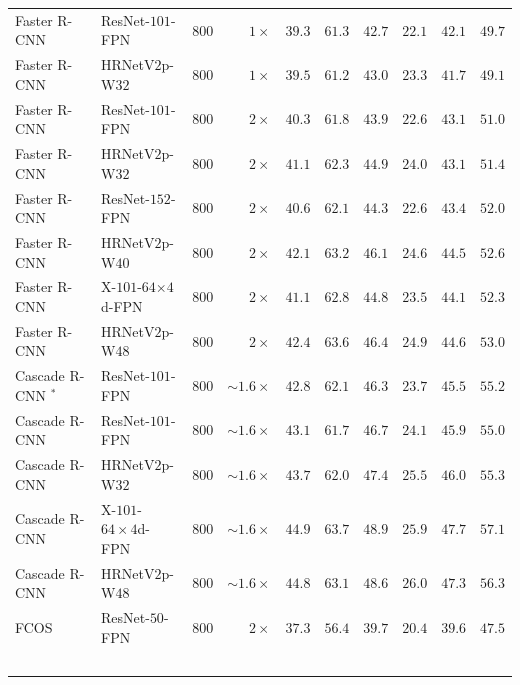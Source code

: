 \documentclass[10pt,journal,compsoc]{IEEEtran}
\begin{document}
\begin{table}[ht]
\begin{tabular}{l|lcr|ccc|ccc}
	    \hline
        Faster R-CNN \cite{LinDGHHB17} & ResNet-$101$-FPN & $800$ & $1\times$ & $39.3$ & $61.3$ & $42.7$ & $22.1$ & $42.1$ & $49.7$ \\
        Faster R-CNN & HRNetV$2$p-W$32$ & $800$ & $1\times$ & $39.5$ & $61.2$ & $43.0$ & $23.3$ & $41.7$ & $49.1$  \\%
        \arrayrulecolor{gray}\hline\arrayrulecolor{black}
		Faster R-CNN \cite{LinDGHHB17} & ResNet-$101$-FPN & $800$ & $2\times$ & $40.3$ & $61.8$ & $43.9$ & $22.6$ & $43.1$ & $51.0$ \\
		Faster R-CNN & HRNetV$2$p-W$32$ & $800$ & $2\times$  & $41.1$ & $62.3$ & $44.9$ & $24.0$ & $43.1$ & $51.4$ \\	
		\arrayrulecolor{gray}\hline\arrayrulecolor{black}
		Faster R-CNN \cite{LinDGHHB17} & ResNet-$152$-FPN & $800$ & $2\times$ & $40.6$ & $62.1$ & $44.3$ & $22.6$ & $43.4$ & $52.0$ \\
		Faster R-CNN & HRNetV$2$p-W$40$ & $800$ & $2\times$  & $42.1$ & $63.2$ & $46.1$ & $24.6$ & $44.5$ & $52.6$ \\
		\arrayrulecolor{gray}\hline\arrayrulecolor{black}
	    Faster R-CNN \cite{mmdetection} & X-$101$-$64$$\times4$d-FPN & $800$ & $2\times$ & $41.1$ & $62.8$ & $44.8$ & $23.5$ & $44.1$ & $52.3$ \\
		Faster R-CNN & HRNetV$2$p-W$48$ &  $800$ & $2\times$ & $42.4$ & ${63.6}$ & $46.4$ & $24.9$ & $44.6$ & $53.0$ \\
		\arrayrulecolor{black}\hline\arrayrulecolor{black}
	    Cascade R-CNN \cite{CaiV18}$^*$ & ResNet-$101$-FPN & $800$ & $\sim 1.6\times$ & $42.8$ & $62.1$ & $46.3$  & $23.7$ & $45.5$ & $55.2$ \\
	    Cascade R-CNN & ResNet-$101$-FPN & $800$ & $\sim 1.6\times$ & $43.1$ & $61.7$ & $46.7$ & $24.1$ & $45.9$ & $55.0$ \\
	    Cascade R-CNN & HRNetV$2$p-W$32$  & $800$ & $\sim 1.6\times$ & $43.7$ & $62.0$ & $47.4$ & $25.5$ & $46.0$ & $55.3$ \\
	    {Cascade R-CNN} & X-$101$-$64\times4$d-FPN  & $800$ & $\sim 1.6\times$ & $44.9$ & $63.7$ & $48.9$ & $25.9$ & $47.7$ & $57.1$ \\
	    {Cascade R-CNN} & HRNetV$2$p-W$48$  & $800$ & $\sim 1.6\times$ & $44.8$ & $63.1$ & $48.6$ & $26.0$ & $47.3$ & $56.3$ \\
	 \arrayrulecolor{black}\hline\arrayrulecolor{black}
	    FCOS~\cite{TianSCH19} & ResNet-$50$-FPN & $800$ & $2\times$ & $37.3$ & $56.4$ & $39.7$ & $20.4$ & $39.6$ & $47.5$ \\
$$
\end{tabular}
\end{table}
\end{document}
